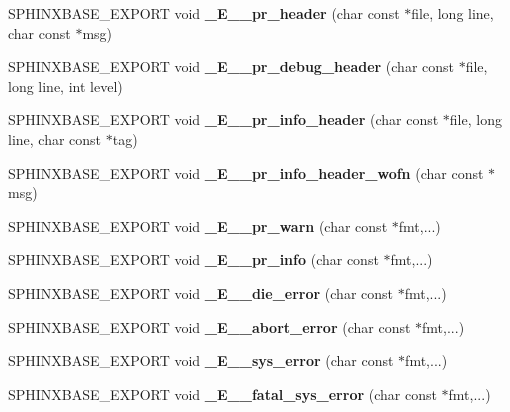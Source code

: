 \begin{CompactItemize}
\item 
SPHINXBASE\_\-EXPORT void \textbf{\_\-E\_\-\_\-pr\_\-header} (char const $\ast$file, long line, char const $\ast$msg)\label{err_8h_96379bbd8a6c62698d166e5d12f3370d}

\item 
SPHINXBASE\_\-EXPORT void \textbf{\_\-E\_\-\_\-pr\_\-debug\_\-header} (char const $\ast$file, long line, int level)\label{err_8h_173ee0173de4543e08d9d7a38ce18b88}

\item 
SPHINXBASE\_\-EXPORT void \textbf{\_\-E\_\-\_\-pr\_\-info\_\-header} (char const $\ast$file, long line, char const $\ast$tag)\label{err_8h_583592f006ae14756c0c4812048c9b5f}

\item 
SPHINXBASE\_\-EXPORT void \textbf{\_\-E\_\-\_\-pr\_\-info\_\-header\_\-wofn} (char const $\ast$msg)\label{err_8h_bb0389e05db688aee439b339f7f6ed89}

\item 
SPHINXBASE\_\-EXPORT void \textbf{\_\-E\_\-\_\-pr\_\-warn} (char const $\ast$fmt,...)\label{err_8h_3c2a4f988b27b2fa9baaa8ecd3f1e61f}

\item 
SPHINXBASE\_\-EXPORT void \textbf{\_\-E\_\-\_\-pr\_\-info} (char const $\ast$fmt,...)\label{err_8h_04fbf9d2c44e4e72f64cd3e2f5a24c38}

\item 
SPHINXBASE\_\-EXPORT void \textbf{\_\-E\_\-\_\-die\_\-error} (char const $\ast$fmt,...)\label{err_8h_e2149bb7cde661a9bee0bdaaea7fab2d}

\item 
SPHINXBASE\_\-EXPORT void \textbf{\_\-E\_\-\_\-abort\_\-error} (char const $\ast$fmt,...)\label{err_8h_0cdeb87987f0c30cd0c99826f9a1f7a8}

\item 
SPHINXBASE\_\-EXPORT void \textbf{\_\-E\_\-\_\-sys\_\-error} (char const $\ast$fmt,...)\label{err_8h_750133ab0eeba2bceba2a4054469857b}

\item 
SPHINXBASE\_\-EXPORT void \textbf{\_\-E\_\-\_\-fatal\_\-sys\_\-error} (char const $\ast$fmt,...)\label{err_8h_39faf53d575084585f79fe685943e95a}


\end{CompactItemize}
